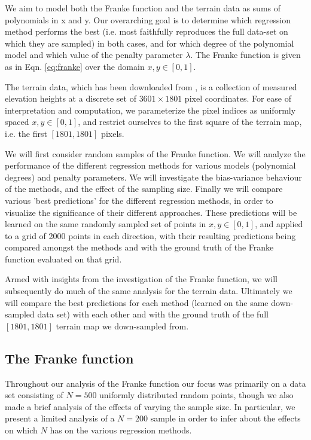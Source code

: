 \documentclass[reprint, english, nofootinbib]{revtex4-2}
\begin{document}
We aim to model both the Franke function and the terrain data as sums of polynomials in x and y. Our overarching goal is to determine which regression method performs the best (i.e. most faithfully reproduces the full data-set on which they are sampled) in both cases, and for which degree of the polynomial model and which value of the penalty parameter $\lambda$. The Franke function is given as in Eqn. \ref{eq:franke} over the domain $x,y \in [0,1]$.

The terrain data, which has been downloaded from \cite{4155_repo}, is a collection of measured elevation heights at a discrete set of $3601\times1801$ pixel coordinates. For ease of interpretation and computation, we parameterize the pixel indices as uniformly spaced $x,y \in [0,1]$, and restrict ourselves to the first square of the terrain map, i.e. the first $[1801,1801]$ pixels.


We will first consider random samples of the Franke function. We will analyze the performance of the different regression methods for various models (polynomial degrees) and penalty parameters. We will investigate the bias-variance behaviour of the methods, and the effect of the sampling size.  Finally we will compare various 'best predictions' for the different regression methods, in order to visualize the significance of their different approaches. These predictions will be learned on the same randomly sampled set of points in $x,y \in [0,1]$, and applied to a grid of 2000 points in each direction, with their resulting predictions being compared amongst the methods and with the ground truth of the Franke function evaluated on that grid.

Armed with insights from the investigation of the Franke function, we will subsequently do much of the same analysis for the terrain data. Ultimately we will compare the best predictions for each method (learned on the same down-sampled data set) with each other and with the ground truth of the full $[1801,1801]$ terrain map we down-sampled from.

\subsection{The Franke function}

\noindent
Throughout our analysis of the Franke function our focus was primarily on a data set consisting of $N=500$ uniformly distributed random points, though we also made a brief analysis of the effects of varying the sample size. In particular, we present a limited analysis of a $N=200$ sample in order to infer about the effects on which $N$ has on the various regression methods.
\end{document}
